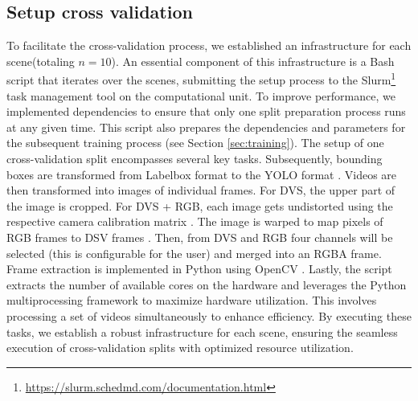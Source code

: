 \documentclass[sigchi,screen]{acmart}
\begin{document}
\subsection{Setup cross validation}
To facilitate the cross-validation process, we established an infrastructure for each scene(totaling $n = 10$). An essential component of this infrastructure is a Bash script that iterates over the scenes, submitting the setup process to the Slurm\footnote{\url{https://slurm.schedmd.com/documentation.html}} task management tool on the computational unit. To improve performance, we implemented dependencies to ensure that only one split preparation process runs at any given time. This script also prepares the dependencies and parameters for the subsequent training process (see Section \ref{sec:training}). The setup of one cross-validation split encompasses several key tasks. Subsequently, bounding boxes are transformed from Labelbox format to the YOLO format \citep{wang2023yolov7}. Videos are then transformed into images of individual frames. For DVS, the upper part of the image is cropped. For DVS + RGB, each image gets undistorted using the respective camera calibration matrix \citep{zhang2000flexible}. The image is warped to map pixels of RGB frames to DSV frames \citep{glasbey1998review}. Then, from DVS and RGB four channels will be selected (this is configurable for the user) and merged into an RGBA frame. Frame extraction is implemented in Python using OpenCV \citep{bradski2000opencv}. Lastly, the script extracts the number of available cores on the hardware and leverages the Python multiprocessing framework to maximize hardware utilization. This involves processing a set of videos simultaneously to enhance efficiency. By executing these tasks, we establish a robust infrastructure for each scene, ensuring the seamless execution of cross-validation splits with optimized resource utilization.
\end{document}
